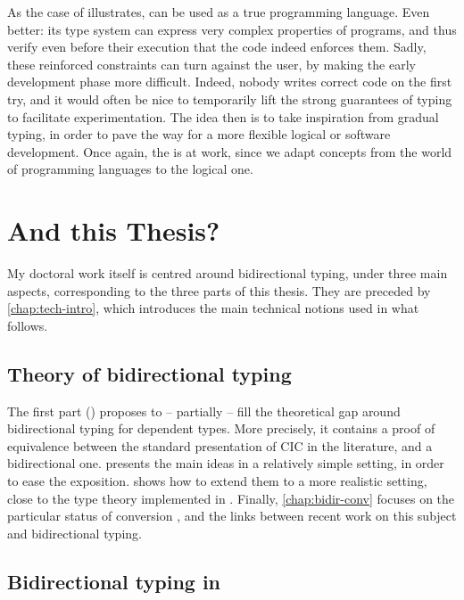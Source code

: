 As the case of  illustrates,  can be used as a true programming language.
Even better: its type system can express very complex properties of programs, and thus
verify even before their execution that the code indeed enforces them.
Sadly, these reinforced constraints can turn against the user, by making the
early development phase more difficult. Indeed, nobody writes correct code on the first try,
and it would often be nice to temporarily lift the strong guarantees of typing to
facilitate experimentation. The idea then is to take inspiration from gradual typing,
in order to pave the way for a more flexible logical or software development. Once again, the
 is at work, since we adapt concepts from the world of
programming languages to the logical one.

\section{And this Thesis?}
\label{sec:this-thesis}

My doctoral work itself is centred around bidirectional typing, under three main aspects,
corresponding to the three parts of this thesis.
They are preceded by \cref{chap:tech-intro}, which introduces the main technical notions
used in what follows.

\subsection{Theory of bidirectional typing}

The first part () proposes to – partially – fill the theoretical gap around
bidirectional typing for dependent types. More precisely, it contains a proof of equivalence
between the standard presentation of CIC in the literature, and a bidirectional one.
 presents the main ideas in a relatively
simple setting, in order to ease the exposition.  shows how to extend
them to a more realistic setting, close to the type theory implemented in .
Finally, \cref{chap:bidir-conv} focuses on the particular status of conversion%
,
and the links between recent work on this subject and bidirectional typing.

\subsection{Bidirectional typing in }

